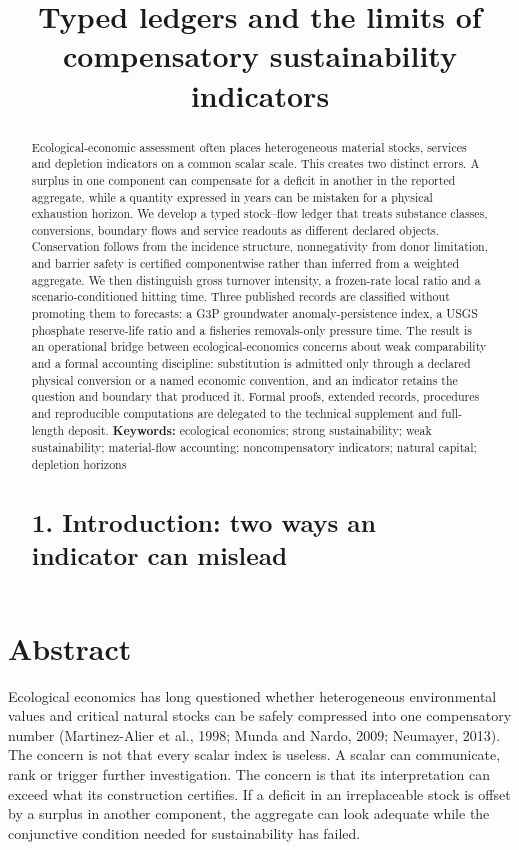 \documentclass[11pt]{article}
\title{Typed ledgers and the limits of compensatory sustainability indicators}
\author{}
\date{}
\begin{document}
\maketitle
\section{Abstract}
\begin{abstract}
Ecological-economic assessment often places heterogeneous material stocks, services and depletion indicators on a common scalar scale. This creates two distinct errors. A surplus in one component can compensate for a deficit in another in the reported aggregate, while a quantity expressed in years can be mistaken for a physical exhaustion horizon. We develop a typed stock--flow ledger that treats substance classes, conversions, boundary flows and service readouts as different declared objects. Conservation follows from the incidence structure, nonnegativity from donor limitation, and barrier safety is certified componentwise rather than inferred from a weighted aggregate. We then distinguish gross turnover intensity, a frozen-rate local ratio and a scenario-conditioned hitting time. Three published records are classified without promoting them to forecasts: a G3P groundwater anomaly-persistence index, a USGS phosphate reserve-life ratio and a fisheries removals-only pressure time. The result is an operational bridge between ecological-economics concerns about weak comparability and a formal accounting discipline: substitution is admitted only through a declared physical conversion or a named economic convention, and an indicator retains the question and boundary that produced it. Formal proofs, extended records, procedures and reproducible computations are delegated to the technical supplement and full-length deposit.
\textbf{Keywords:} ecological economics; strong sustainability; weak sustainability; material-flow accounting; noncompensatory indicators; natural capital; depletion horizons
\section{1. Introduction: two ways an indicator can mislead}
\end{abstract}
Ecological economics has long questioned whether heterogeneous environmental values and critical natural stocks can be safely compressed into one compensatory number (Martinez-Alier et al., 1998; Munda and Nardo, 2009; Neumayer, 2013). The concern is not that every scalar index is useless. A scalar can communicate, rank or trigger further investigation. The concern is that its interpretation can exceed what its construction certifies. If a deficit in an irreplaceable stock is offset by a surplus in another component, the aggregate can look adequate while the conjunctive condition needed for sustainability has failed.
\end{document}
